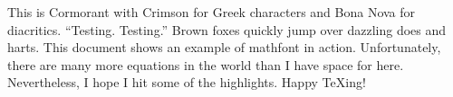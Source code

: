 \documentclass[12pt]{article}
\begin{document}
\def\footnote#1{}
\def\showabstract{0}
\let\textsf\relax
\let\ttfamily\relax
\def\documentname{Example---Cormorant}



This is Cormorant with Crimson for Greek characters and Bona Nova for diacritics. ``Testing. Testing.'' Brown foxes quickly jump over dazzling does and harts. This document shows an example of mathfont in action. Unfortunately, there are many more equations in the world than I have space for here. Nevertheless, I hope I hit some of the highlights. Happy \TeX ing!


\end{document}
